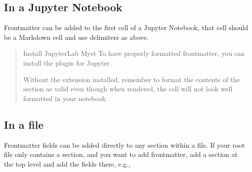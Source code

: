 \documentclass[letterpaper,12pt,english]{sphinxmanual}
\begin{document}
\begin{sphinxVerbatim}[commandchars=\\\{\}]
\end{sphinxVerbatim}


\subsection{In a Jupyter Notebook}
\label{\detokenize{notebooks/02-myst.integration:in-a-jupyter-notebook}}
\sphinxAtStartPar
Frontmatter can be added to the first cell of a Jupyter Notebook, that cell should be a Markdown cell and use \sphinxcode{\sphinxupquote{\sphinxhyphen{}\sphinxhyphen{}\sphinxhyphen{}}} delimiters as above.
\begin{quote}

\sphinxAtStartPar
{} Install JupyterLab Myst
To have properly formatted frontmatter, you can install the  plugin for Jupyter.

\sphinxAtStartPar
{}

\sphinxAtStartPar
Without the extension installed, remember to format the contents of the section as valid  even though when rendered, the cell will not look well formatted in your notebook.
\end{quote}


\subsection{In a  file}
\label{\detokenize{notebooks/02-myst.integration:in-a-myst-yml-file}}
\sphinxAtStartPar
Frontmatter fields can be added directly to any  section within a  file. If your root  file only contains a  section, and you want to add frontmatter, add a  section at the top level and add the fields there, e.g.,
\end{document}
